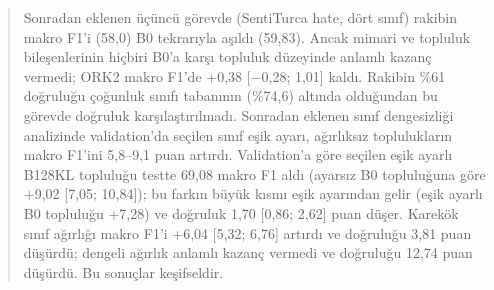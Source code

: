 \documentclass[11pt]{article}
\begin{document}
\begin{abstract}
Sonradan eklenen üçüncü görevde (SentiTurca hate, dört sınıf) rakibin makro F1'i (58,0) B0 tekrarıyla aşıldı (59,83). Ancak mimari ve topluluk bileşenlerinin hiçbiri B0'a karşı topluluk düzeyinde anlamlı kazanç vermedi; ORK2 makro F1'de +0,38 [$-$0,28; 1,01] kaldı. Rakibin \%61 doğruluğu çoğunluk sınıfı tabanının (\%74,6) altında olduğundan bu görevde doğruluk karşılaştırılmadı. Sonradan eklenen sınıf dengesizliği analizinde validation'da seçilen sınıf eşik ayarı, ağırlıksız toplulukların makro F1'ini 5,8–9,1 puan artırdı. Validation'a göre seçilen eşik ayarlı B128KL topluluğu testte 69,08 makro F1 aldı (ayarsız B0 topluluğuna göre +9,02 [7,05; 10,84]); bu farkın büyük kısmı eşik ayarından gelir (eşik ayarlı B0 topluluğu +7,28) ve doğruluk 1,70 [0,86; 2,62] puan düşer. Karekök sınıf ağırlığı makro F1'i +6,04 [5,32; 6,76] artırdı ve doğruluğu 3,81 puan düşürdü; dengeli ağırlık anlamlı kazanç vermedi ve doğruluğu 12,74 puan düşürdü. Bu sonuçlar keşifseldir.

\end{abstract}
\end{document}
